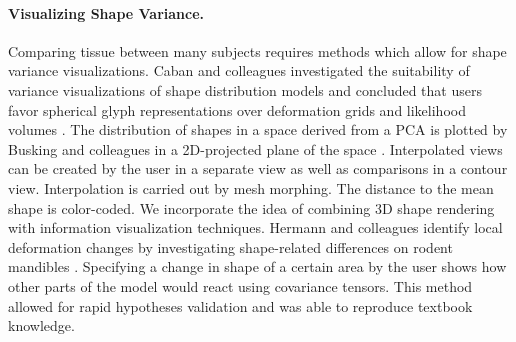 \documentclass[journal]{style/vgtc} 			          %
\begin{document}
\paragraph{Visualizing Shape Variance.}
Comparing tissue between many subjects requires methods which allow for shape variance visualizations.
%
Caban and colleagues investigated the suitability of variance visualizations of shape distribution models and concluded that users favor spherical glyph representations over deformation grids and likelihood volumes \cite{Caban2011}.
%
The distribution of shapes in a space derived from a PCA is plotted by Busking and colleagues in a 2D-projected plane of the space \cite{Busking2010a}.
%
Interpolated views can be created by the user in a separate view as well as comparisons in a contour view.
%
Interpolation is carried out by mesh morphing.
%
The distance to the mean shape is color-coded.
%
We incorporate the idea of combining 3D shape rendering with information visualization techniques.
%
%
%
Hermann and colleagues identify local deformation changes by investigating shape-related differences on rodent mandibles \cite{Hermann2014}.
Specifying a change in shape of a certain area by the user shows how other parts of the model would react using covariance tensors.
%
This method allowed for rapid hypotheses validation and was able to reproduce textbook knowledge.
%
%
%

\end{document}
